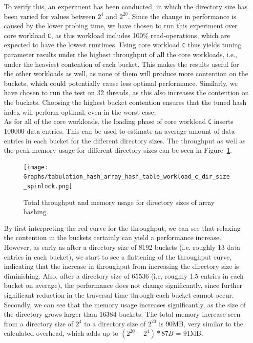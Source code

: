 \documentclass[11pt]{article} %
\begin{document}
To verify this, an experiment has been conducted, in which the directory size has been varied for values between $2^4$ and $2^{20}$. Since the change in performance is caused by the lower probing time, we have chosen to run this experiment over core workload \verb|C|, as this workload includes 100\% read-operations, which are expected to have the lowest runtimes. Using core workload \verb|C| thus yields tuning parameter results under the highest throughput of all the core workloads, i.e., under the heaviest contention of each bucket. This makes the results useful for the other workloads as well, as none of them will produce more contention on the buckets, which could potentially cause less optimal performance. Similarly, we have chosen to run the test on 32 threads, as this also increases the contention on the buckets. Choosing the highest bucket contention ensures that the tuned hash index will perform optimal, even in the worst case.
\\
As for all of the core workloads, the loading phase of core workload \verb|C| inserts 100000 data entries. This can be used to estimate an average amount of data entries in each bucket for the different directory sizes. The throughput as well as the peak memory usage for different directory sizes can be seen in Figure~\ref{fig:dir_size}.

\begin{figure}[H]
  \centering
  \texttt{[image: Graphs/tabulation\_hash\_array\_hash\_table\_workload\_c\_dir\_size\_spinlock.png]}\\
  \caption{Total throughput and memory usage for directory sizes of array hashing.}\label{fig:dir_size}
\end{figure}
By first interpreting the red curve for the throughput, we can see that relaxing the contention in the buckets certainly can yield a performance increase. However, as early as after a directory size of 8192 buckets (i.e. roughly 13 data entries in each bucket), we start to see a flattening of the throughput curve, indicating that the increase in throughput from increasing the directory size is diminishing. Also, after a directory size of 65536 (i.e, roughly 1.5 entries in each bucket on average), the performance does not change significantly, since further significant reduction in the traversal time through each bucket cannot occur.\\

Secondly, we can see that the memory usage increases significantly, as the size of the directory grows larger than 16384 buckets. The total memory increase seen from a directory size of $2^4$ to a directory size of $2^{20}$ is 90MB, very similar to the calculated overhead, which adds up to $(2^{20}-2^{4})*87B$ = 91MB.\\
\end{document}
